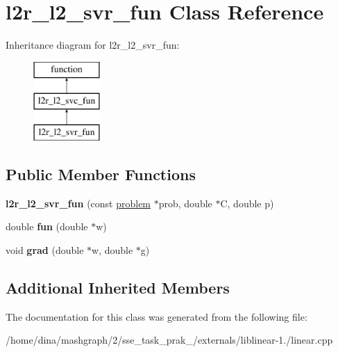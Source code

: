 \hypertarget{classl2r__l2__svr__fun}{\section{l2r\-\_\-l2\-\_\-svr\-\_\-fun Class Reference}
\label{classl2r__l2__svr__fun}
}
Inheritance diagram for l2r\-\_\-l2\-\_\-svr\-\_\-fun\-:\begin{figure}[H]
\begin{center}
\leavevmode
\includegraphics[height=3.000000cm]{classl2r__l2__svr__fun}
\end{center}
\end{figure}
\subsection*{Public Member Functions}
\begin{DoxyCompactItemize}
\item 
\hypertarget{classl2r__l2__svr__fun_ac065e20dc43f8c15680ca32b149c07cb}{{\bfseries l2r\-\_\-l2\-\_\-svr\-\_\-fun} (const \hyperlink{structproblem}{problem} $\ast$prob, double $\ast$C, double p)}\label{classl2r__l2__svr__fun_ac065e20dc43f8c15680ca32b149c07cb}

\item 
\hypertarget{classl2r__l2__svr__fun_a2a07ce28b2d378a3e2d2ca6c1f7fcdd5}{double {\bfseries fun} (double $\ast$w)}\label{classl2r__l2__svr__fun_a2a07ce28b2d378a3e2d2ca6c1f7fcdd5}

\item 
\hypertarget{classl2r__l2__svr__fun_a270cc88e7ba1a898472edbf1beb05580}{void {\bfseries grad} (double $\ast$w, double $\ast$g)}\label{classl2r__l2__svr__fun_a270cc88e7ba1a898472edbf1beb05580}

\end{DoxyCompactItemize}
\subsection*{Additional Inherited Members}


The documentation for this class was generated from the following file\-:\begin{DoxyCompactItemize}
\item 
/home/dina/mashgraph/2/sse\-\_\-task\-\_\-prak\-\_/externals/liblinear-\/1./linear.\-cpp\end{DoxyCompactItemize}
